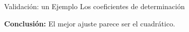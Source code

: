 \documentclass[xcolor=svgnames]{beamer} %
\theoremstyle{plain}
\renewcommand{\textbf}[1]{{\bfseries\textcolor{redUnq2}{#1}}}
\theoremstyle{definition}
\begin{document}
\begin{frame}{Validación: un Ejemplo}
  Los coeficientes de determinación
  \begin{center}
  \begin{minipage}{.6\linewidth}
  \end{minipage}
  \end{center}\vspace{-3pt}  	
  \pause 
  \begin{tcolorbox}
	\textbf{Conclusión:} El mejor ajuste parece ser el cuadrático.
  \end{tcolorbox}

\end{frame}
\end{document}

